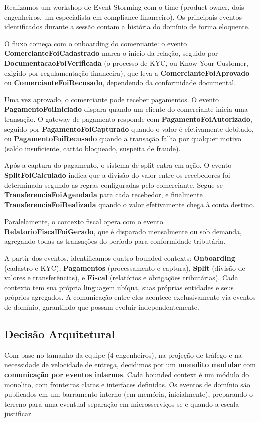 Realizamos um workshop de Event Storming com o time (product owner, dois
engenheiros, um especialista em compliance financeiro). Os principais eventos
identificados durante a sessão contam a história do domínio de forma
eloquente.

O fluxo começa com o onboarding do comerciante: o evento \textbf{ComercianteFoiCadastrado}
marca o início da relação, seguido por \textbf{DocumentacaoFoiVerificada} (o processo
de KYC, ou Know Your Customer, exigido por regulamentação financeira), que leva
a \textbf{ComercianteFoiAprovado} ou \textbf{ComercianteFoiRecusado}, dependendo da
conformidade documental.

Uma vez aprovado, o comerciante pode receber pagamentos. O evento
\textbf{PagamentoFoiIniciado} dispara quando um cliente do comerciante inicia uma
transação. O gateway de pagamento responde com \textbf{PagamentoFoiAutorizado}, seguido
por \textbf{PagamentoFoiCapturado} quando o valor é efetivamente debitado, ou
\textbf{PagamentoFoiRecusado} quando a transação falha por qualquer motivo (saldo
insuficiente, cartão bloqueado, suspeita de fraude).

Após a captura do pagamento, o sistema de split entra em ação. O evento
\textbf{SplitFoiCalculado} indica que a divisão do valor entre os recebedores foi
determinada segundo as regras configuradas pelo comerciante. Segue-se
\textbf{TransferenciaFoiAgendada} para cada recebedor, e finalmente
\textbf{TransferenciaFoiRealizada} quando o valor efetivamente chega à conta destino.

Paralelamente, o contexto fiscal opera com o evento \textbf{RelatorioFiscalFoiGerado},
que é disparado mensalmente ou sob demanda, agregando todas as transações do período
para conformidade tributária.

A partir dos eventos, identificamos quatro bounded contexts: \textbf{Onboarding}
(cadastro e KYC), \textbf{Pagamentos} (processamento e captura), \textbf{Split}
(divisão de valores e transferências), e \textbf{Fiscal} (relatórios e
obrigações tributárias). Cada contexto tem sua própria linguagem ubíqua, suas
próprias entidades e seus próprios agregados. A comunicação entre eles acontece
exclusivamente via eventos de domínio, garantindo que possam evoluir
independentemente.

\subsection{Decisão Arquitetural}

Com base no tamanho da equipe (4 engenheiros), na projeção de tráfego e na
necessidade de velocidade de entrega, decidimos por um \textbf{monolito modular}
com \textbf{comunicação por eventos internos}. Cada bounded context é um módulo
do monolito, com fronteiras claras e interfaces definidas. Os eventos de domínio
são publicados em um barramento interno (em memória, inicialmente), preparando
o terreno para uma eventual separação em microsserviços se e quando a escala
justificar.

